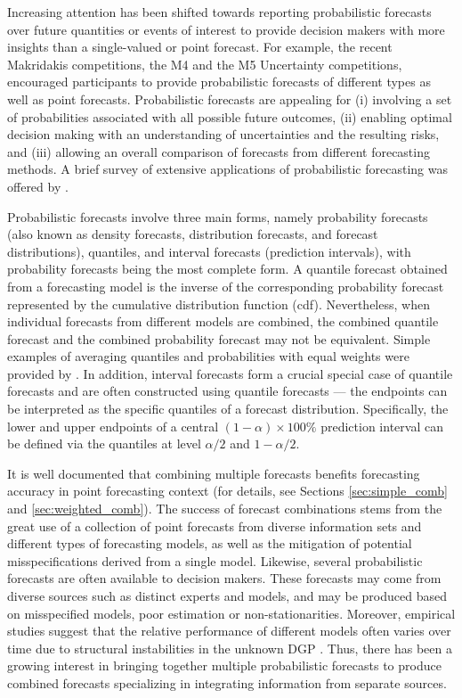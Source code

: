 \documentclass[11pt]{article}
\begin{document}
Increasing attention has been shifted towards reporting probabilistic forecasts over future quantities or events of interest to provide decision makers with more insights than a single-valued or point forecast. For example, the recent Makridakis competitions, the M4 and the M5 Uncertainty \citep{Makridakis2020-lz} competitions, encouraged participants to provide probabilistic forecasts of different types as well as point forecasts. Probabilistic forecasts are appealing for (i) involving a set of probabilities associated with all possible future outcomes, (ii) enabling optimal decision making with an understanding of uncertainties and the resulting risks, and (iii) allowing an overall comparison of forecasts from different forecasting methods. A brief survey of extensive applications of probabilistic forecasting was offered by \citet{Gneiting2014-tz}.

Probabilistic forecasts involve three main forms, namely probability forecasts (also known as density forecasts, distribution forecasts, and forecast distributions),  quantiles, and interval forecasts (prediction intervals), with probability forecasts being the most complete form. A quantile forecast obtained from a forecasting model is the inverse of the corresponding probability forecast represented by the cumulative distribution function (cdf). Nevertheless, when individual forecasts from different models are combined, the combined quantile forecast and the combined probability forecast may not be equivalent. Simple examples of averaging quantiles and probabilities with equal weights were provided by \citet{Lichtendahl2013-rt}. In addition, interval forecasts form a crucial special case of quantile forecasts and are often constructed using quantile forecasts --- the endpoints can be interpreted as the specific quantiles of a forecast distribution. Specifically, the lower and upper endpoints of a central $(1-\alpha)\times 100\%$ prediction interval can be defined via the quantiles at level $\alpha/2$ and $1-\alpha/2$.

It is well documented that combining multiple forecasts benefits forecasting accuracy in point forecasting context (for details, see Sections \ref{sec:simple_comb} and \ref{sec:weighted_comb}). The success of forecast combinations stems from the great use of a collection of point forecasts from diverse information sets and different types of forecasting models, as well as the mitigation of potential misspecifications derived from a single model. Likewise, several probabilistic forecasts are often available to decision makers. These forecasts may come from diverse sources such as distinct experts and models, and may be produced based on misspecified models, poor estimation or non-stationarities. Moreover, empirical studies suggest that the relative performance of different models often varies over time due to structural instabilities in the unknown DGP \citep[e.g.,][]{Billio2013-sg}. Thus, there has been a growing interest in bringing together multiple probabilistic forecasts to produce combined forecasts specializing in integrating information from separate sources.
\end{document}
